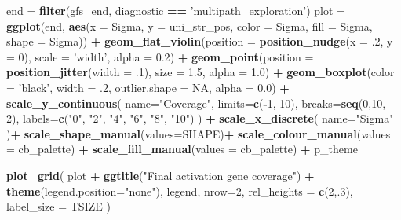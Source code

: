 \documentclass[]{book}
\newenvironment{Shaded}{\begin{snugshade}}{\end{snugshade}}
\newcommand{\DataTypeTok}[1]{\textcolor[rgb]{0.13,0.29,0.53}{#1}}
\newcommand{\DecValTok}[1]{\textcolor[rgb]{0.00,0.00,0.81}{#1}}
\newcommand{\FloatTok}[1]{\textcolor[rgb]{0.00,0.00,0.81}{#1}}
\newcommand{\KeywordTok}[1]{\textcolor[rgb]{0.13,0.29,0.53}{\textbf{#1}}}
\newcommand{\NormalTok}[1]{#1}
\newcommand{\OperatorTok}[1]{\textcolor[rgb]{0.81,0.36,0.00}{\textbf{#1}}}
\newcommand{\OtherTok}[1]{\textcolor[rgb]{0.56,0.35,0.01}{#1}}
\newcommand{\StringTok}[1]{\textcolor[rgb]{0.31,0.60,0.02}{#1}}
\begin{document}
\begin{Shaded}
\begin{Highlighting}[]
\NormalTok{end =}\StringTok{ }\KeywordTok{filter}\NormalTok{(gfs_end, diagnostic }\OperatorTok{==}\StringTok{ 'multipath_exploration'}\NormalTok{)}
\NormalTok{plot =}\StringTok{ }\KeywordTok{ggplot}\NormalTok{(end, }\KeywordTok{aes}\NormalTok{(}\DataTypeTok{x =}\NormalTok{ Sigma, }\DataTypeTok{y =}\NormalTok{ uni_str_pos, }\DataTypeTok{color =}\NormalTok{ Sigma, }\DataTypeTok{fill =}\NormalTok{ Sigma, }\DataTypeTok{shape =}\NormalTok{ Sigma)) }\OperatorTok{+}
\StringTok{  }\KeywordTok{geom_flat_violin}\NormalTok{(}\DataTypeTok{position =} \KeywordTok{position_nudge}\NormalTok{(}\DataTypeTok{x =} \FloatTok{.2}\NormalTok{, }\DataTypeTok{y =} \DecValTok{0}\NormalTok{), }\DataTypeTok{scale =} \StringTok{'width'}\NormalTok{, }\DataTypeTok{alpha =} \FloatTok{0.2}\NormalTok{) }\OperatorTok{+}
\StringTok{  }\KeywordTok{geom_point}\NormalTok{(}\DataTypeTok{position =} \KeywordTok{position_jitter}\NormalTok{(}\DataTypeTok{width =} \FloatTok{.1}\NormalTok{), }\DataTypeTok{size =} \FloatTok{1.5}\NormalTok{, }\DataTypeTok{alpha =} \FloatTok{1.0}\NormalTok{) }\OperatorTok{+}
\StringTok{  }\KeywordTok{geom_boxplot}\NormalTok{(}\DataTypeTok{color =} \StringTok{'black'}\NormalTok{, }\DataTypeTok{width =} \FloatTok{.2}\NormalTok{, }\DataTypeTok{outlier.shape =} \OtherTok{NA}\NormalTok{, }\DataTypeTok{alpha =} \FloatTok{0.0}\NormalTok{) }\OperatorTok{+}
\StringTok{  }\KeywordTok{scale_y_continuous}\NormalTok{(}
    \DataTypeTok{name=}\StringTok{"Coverage"}\NormalTok{,}
    \DataTypeTok{limits=}\KeywordTok{c}\NormalTok{(}\OperatorTok{-}\DecValTok{1}\NormalTok{, }\DecValTok{10}\NormalTok{),}
    \DataTypeTok{breaks=}\KeywordTok{seq}\NormalTok{(}\DecValTok{0}\NormalTok{,}\DecValTok{10}\NormalTok{, }\DecValTok{2}\NormalTok{),}
    \DataTypeTok{labels=}\KeywordTok{c}\NormalTok{(}\StringTok{"0"}\NormalTok{, }\StringTok{"2"}\NormalTok{, }\StringTok{"4"}\NormalTok{, }\StringTok{"6"}\NormalTok{, }\StringTok{"8"}\NormalTok{, }\StringTok{"10"}\NormalTok{)}
\NormalTok{  ) }\OperatorTok{+}
\StringTok{  }\KeywordTok{scale_x_discrete}\NormalTok{(}
    \DataTypeTok{name=}\StringTok{"Sigma"}
\NormalTok{  )}\OperatorTok{+}
\StringTok{  }\KeywordTok{scale_shape_manual}\NormalTok{(}\DataTypeTok{values=}\NormalTok{SHAPE)}\OperatorTok{+}
\StringTok{  }\KeywordTok{scale_colour_manual}\NormalTok{(}\DataTypeTok{values =}\NormalTok{ cb_palette) }\OperatorTok{+}
\StringTok{  }\KeywordTok{scale_fill_manual}\NormalTok{(}\DataTypeTok{values =}\NormalTok{ cb_palette) }\OperatorTok{+}
\StringTok{  }\NormalTok{p_theme}

\KeywordTok{plot_grid}\NormalTok{(}
\NormalTok{  plot }\OperatorTok{+}
\StringTok{    }\KeywordTok{ggtitle}\NormalTok{(}\StringTok{"Final activation gene coverage"}\NormalTok{) }\OperatorTok{+}
\StringTok{    }\KeywordTok{theme}\NormalTok{(}\DataTypeTok{legend.position=}\StringTok{"none"}\NormalTok{),}
\NormalTok{  legend,}
  \DataTypeTok{nrow=}\DecValTok{2}\NormalTok{,}
  \DataTypeTok{rel_heights =} \KeywordTok{c}\NormalTok{(}\DecValTok{2}\NormalTok{,.}\DecValTok{3}\NormalTok{),}
  \DataTypeTok{label_size =}\NormalTok{ TSIZE}
\NormalTok{)}
\end{Highlighting}
\end{Shaded}
\end{document}

